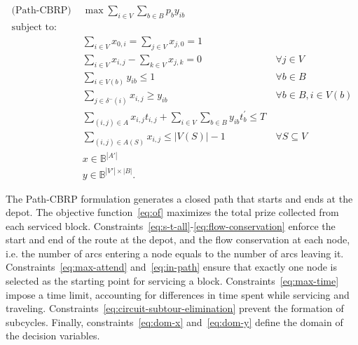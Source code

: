 \begin{align}
	\text{(Path-CBRP) }          & \max \sum_{i \in V} \sum_{b \in B} p_b y_{ib}                                             & \label{eq:of}                                                  \\
	\nonumber \text{subject to:} &                                                                                           &                                                                \\
	                             & \sum_{i \in V} x_{0,i} = \sum_{j \in V} x_{j,0} = 1                                       & \label{eq:s-t-all}                                             \\
	                             & \sum_{i \in V} x_{i,j} - \sum_{k \in V} x_{j,k} = 0                                       & \ \forall j \in V \label{eq:flow-conservation}                 \\
	                             & \sum_{i \in V(b)} y_{ib} \leq 1                                                           & \ \forall b \in B \label{eq:max-attend}                        \\
	                             & \sum_{j \in \delta^{-}(i)} x_{i,j} \geq y_{ib}                                            & \ \forall b \in B, i \in V(b) \label{eq:in-path}               \\
	                             & \sum_{(i, j) \in A} x_{i,j}t_{i,j} + \sum_{i \in V} \sum_{b \in B} y_{ib}t^{'}_{b} \leq T & \label{eq:max-time}                                            \\
	                             & \sum_{(i, j) \in A(S)} x_{i,j} \leq |V(S)| - 1                                            & \ \forall S \subseteq V \label{eq:circuit-subtour-elimination} \\
	                             & x \in \mathbb{B}^{|A'|}                                                                   & \label{eq:dom-x}                                               \\
	                             & y \in \mathbb{B}^{|V'| \times |B|}.                                                       & \label{eq:dom-y}
\end{align}


The Path-CBRP formulation generates a closed path that starts and ends at the
depot. The objective function~\eqref{eq:of} maximizes the total prize collected
from each serviced block.
Constraints~\eqref{eq:s-t-all}-\eqref{eq:flow-conservation} enforce the start
and end of the route at the depot, and the flow conservation at each node, i.e.
the number of arcs entering a node equals to the number of arcs leaving it.
Constraints~\eqref{eq:max-attend} and~\eqref{eq:in-path} ensure that exactly one
node is selected as the starting point for servicing a block.
Constraints~\eqref{eq:max-time} impose a time limit, accounting for differences
in time spent while servicing and traveling.
Constraints~\eqref{eq:circuit-subtour-elimination} prevent the formation of
subcycles. Finally, constraints~\eqref{eq:dom-x} and~\eqref{eq:dom-y} define the
domain of the decision variables.

